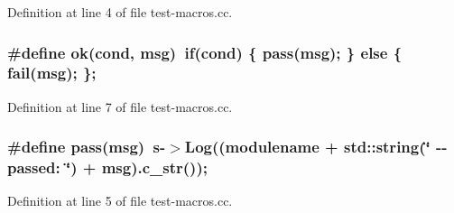 Definition at line 4 of file test-\/macros.cc.

\hypertarget{test-macros_8cc_afaeb9641e4b11cff7242820dbb1c156d}{
\subsubsection[{ok}]{\setlength{\rightskip}{0pt plus 5cm}\#define ok(cond, \/  msg)~if(cond) \{ pass(msg); \} else \{ fail(msg); \};}}
\label{test-macros_8cc_afaeb9641e4b11cff7242820dbb1c156d}


Definition at line 7 of file test-\/macros.cc.

\hypertarget{test-macros_8cc_af496d3b8121eb066859c5af577597d9c}{
\subsubsection[{pass}]{\setlength{\rightskip}{0pt plus 5cm}\#define pass(msg)~s-\/$>$Log((modulename + std::string(\char`\"{} -\/-\/ passed: \char`\"{}) + msg).c\_\-str());}}
\label{test-macros_8cc_af496d3b8121eb066859c5af577597d9c}


Definition at line 5 of file test-\/macros.cc.

